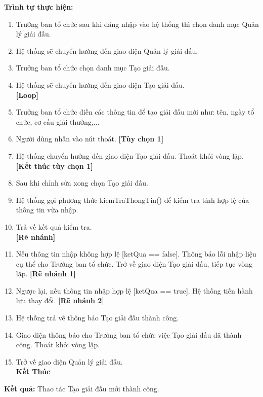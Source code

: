\noindent
\textbf{Trình tự thực hiện:}
\begin{enumerate}
      \item Trưởng ban tổ chức sau khi đăng nhập vào hệ thống thì chọn danh mục Quản lý giải đấu.
      \item Hệ thống sẽ chuyển hướng đến giao diện Quản lý giải đấu.
      \item Trưởng ban tổ chức chọn danh mục Tạo giải đấu.
      \item Hệ thống sẽ chuyển hướng đến giao diện Tạo giải đấu.\\
            \textbf{[Loop]}
      \item    Trưởng ban tổ chức điền các thông tin để tạo giải đấu mới như: tên, ngày tổ chức, cơ cấu giải thưởng,...
      \item Người dùng nhấn vào nút thoát. \textbf{[Tùy chọn 1]}
      \item Hệ thống chuyển hướng đến giao diện Tạo giải đấu. Thoát khỏi vòng lặp. \\
            \textbf{[Kết thúc tùy chọn 1]}
      \item Sau khi chỉnh sửa xong chọn Tạo giải đấu.
      \item Hệ thống gọi phương thức kiemTraThongTin() để kiểm tra tính hợp lệ của thông tin vừa nhập.
      \item Trả về kết quả kiểm tra. \\
            \textbf{[Rẽ nhánh]}
      \item Nếu thông tin nhập không hợp lệ [ketQua == false]. Thông báo lỗi nhập liệu cụ thể cho Trưởng ban tổ chức. Trở về giao diện Tạo giải đấu, tiếp tục vòng lặp. \textbf{[Rẽ nhánh 1]}
      \item Ngược lại, nếu thông tin nhập hợp lệ [ketQua == true]. Hệ thống tiến hành lưu thay đổi. \textbf{[Rẽ nhánh 2]}
      \item Hệ thống trả về thông báo Tạo giải đấu thành công.
      \item Giao diện thông báo cho Trưởng ban tổ chức việc Tạo giải đấu đã thành công. Thoát khỏi vòng lặp.
      \item Trở về giao diện Quản lý giải đấu. \\
            \textbf{Kết Thúc}
\end{enumerate}

\noindent
\textbf{Kết quả:} Thao tác Tạo giải đấu mới thành công.

